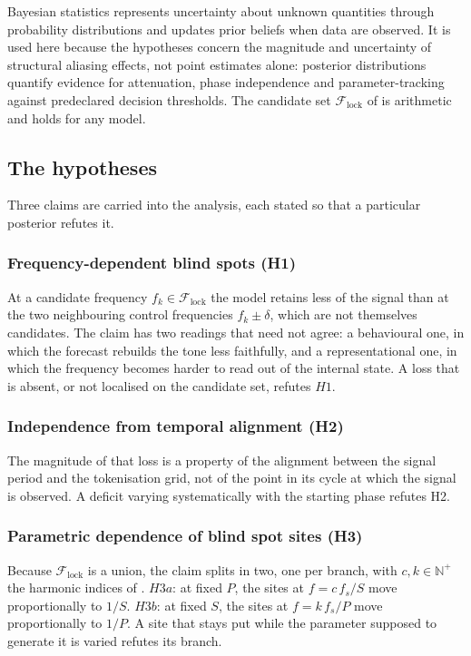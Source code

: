 Bayesian statistics represents uncertainty about unknown quantities through probability distributions and updates prior beliefs when data are observed\autocite{murphyProbabilisticMachineLearning2023}. It is used here because the hypotheses concern the magnitude and uncertainty of structural aliasing effects, not point estimates alone: posterior distributions quantify evidence for attenuation, phase independence and parameter-tracking against predeclared decision thresholds. The candidate set $\mathcal F_{\mathrm{lock}}$ of  is arithmetic and holds for any model.
\subsection{The hypotheses}

Three claims are carried into the analysis, each stated so that a particular posterior refutes it.
\subsubsection{Frequency-dependent blind spots (H1)}
At a candidate frequency $f_k\in\mathcal F_{\mathrm{lock}}$ the model retains less of the signal than at the two neighbouring control frequencies $f_k\pm\delta$, which are not themselves candidates. The claim has two readings that need not agree: a behavioural one, in which the forecast rebuilds the tone less faithfully, and a representational one, in which the frequency becomes harder to read out of the internal state. A loss that is absent, or not localised on the candidate set, refutes $H1$.

\subsubsection{Independence from temporal alignment (H2)}
The magnitude of that loss is a property of the alignment between the signal period and the tokenisation grid, not of the point in its cycle at which the signal is observed. A deficit varying systematically with the starting phase refutes H2.

\subsubsection{Parametric dependence of blind spot sites (H3)}
Because $\mathcal F_{\mathrm{lock}}$ is a union, the claim splits in two, one per branch, with $c,k\in\mathbb{N}^{+}$ the harmonic indices of . $H3a$: at fixed $P$, the sites at $f=c\,f_s/S$ move proportionally to $1/S$. $H3b$: at fixed $S$, the sites at $f=k\,f_s/P$ move proportionally to $1/P$. A site that stays put while the parameter supposed to generate it is varied refutes its branch.

